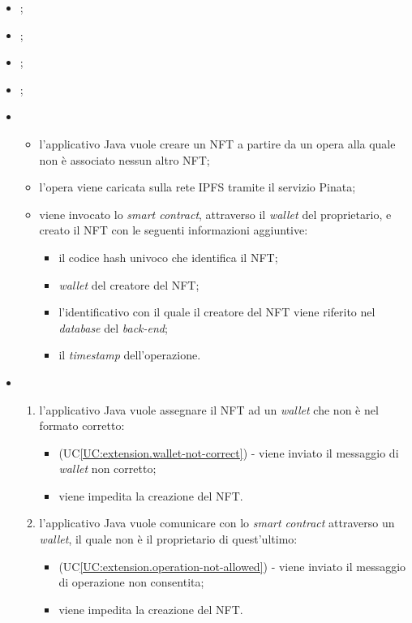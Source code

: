 \begin{itemize}
  \item {};
  \item {};
  \item {};
  \item {};
  \item \UCMain
  
  \begin{itemize}
    \item l'applicativo Java vuole creare un NFT a partire da un opera alla quale non è associato nessun altro NFT;
    \item l'opera viene caricata sulla rete IPFS tramite il servizio Pinata;
    \item viene invocato lo \textit{smart contract}, attraverso il \textit{wallet} del proprietario, e creato il NFT con le seguenti informazioni aggiuntive:
    \begin{itemize}
      \item il codice hash univoco che identifica il NFT;
      \item \textit{wallet} del creatore del NFT;
      \item l'identificativo con il quale il creatore del NFT viene riferito nel \textit{database} del \textit{back-end};
      \item il \textit{timestamp} dell'operazione.
    \end{itemize}
  \end{itemize}
  
  \item \UCExt
  \begin{enumerate}[label=\lett]
    \item l'applicativo Java vuole assegnare il NFT ad un \textit{wallet} che non è nel formato corretto:
    \begin{itemize}
      \item (UC\ref{UC:extension.wallet-not-correct}) - viene inviato il messaggio di \textit{wallet} non corretto;
      \item viene impedita la creazione del NFT.
    \end{itemize}

    \item l'applicativo Java vuole comunicare con lo \textit{smart contract} attraverso un \textit{wallet}, il quale non è il proprietario di quest'ultimo:
    \begin{itemize}
      \item (UC\ref{UC:extension.operation-not-allowed}) - viene inviato il messaggio di operazione non consentita;
      \item viene impedita la creazione del NFT.
    \end{itemize}


\end{enumerate}
\end{itemize}
